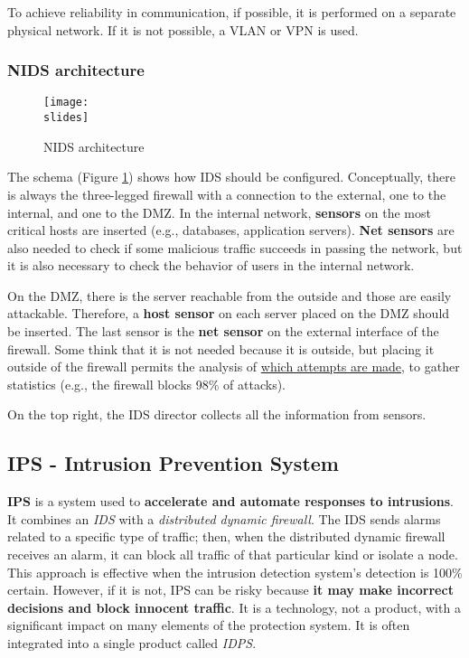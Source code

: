 To achieve reliability in communication, if possible, it is performed on a separate physical network. If it is not possible, a VLAN or VPN is used.


\subsubsection{NIDS architecture}
\begin{figure}[h]
    \centering
    \texttt{[image: \\slides]}
    \caption{NIDS architecture}
    \label{fig:nids-architecture}
\end{figure}

The schema (Figure \ref{fig:nids-architecture}) shows how IDS should be configured. Conceptually, there is always the three-legged firewall with a connection to the external, one to the internal, and one to the DMZ. In the internal network, \textbf{sensors} on the most critical hosts are inserted (e.g., databases, application servers). \textbf{Net sensors} are also needed to check if some malicious traffic succeeds in passing the network, but it is also necessary to check the behavior of users in the internal network.

On the DMZ, there is the server reachable from the outside and those are easily attackable. Therefore, a \textbf{host sensor} on each server placed on the DMZ should be inserted. The last sensor is the \textbf{net sensor} on the external interface of the firewall. Some think that it is not needed because it is outside, but placing it outside of the firewall permits the analysis of \underline{which attempts are made}, to gather statistics (e.g., the firewall blocks 98\% of attacks).

On the top right, the IDS director collects all the information from sensors.

\subsection{IPS - Intrusion Prevention System}

\textbf{IPS} is a system used to \textbf{accelerate and automate responses to intrusions}. It combines an \textit{IDS} with a \textit{distributed dynamic firewall}. The IDS sends alarms related to a specific type of traffic; then, when the distributed dynamic firewall receives an alarm, it can block all traffic of that particular kind or isolate a node. This approach is effective when the intrusion detection system's detection is 100\% certain. However, if it is not, IPS can be risky because \textbf{it may make incorrect decisions and block innocent traffic}. It is a technology, not a product, with a significant impact on many elements of the protection system. 
It is often integrated into a single product called \textit{IDPS}.




